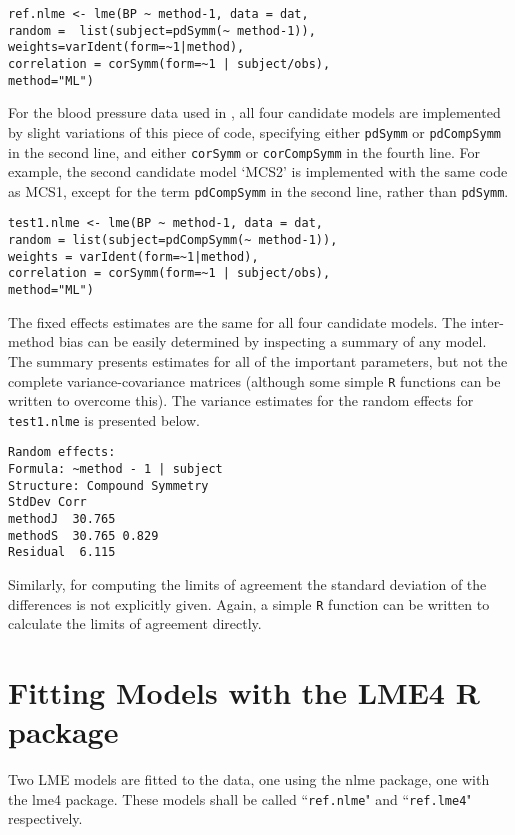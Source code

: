 \documentclass[12pt, a4paper]{report}
\theoremstyle{plain}
\theoremstyle{definition}
\theoremstyle{remark}
\begin{document}
\begin{framed}
\begin{verbatim}
ref.nlme <- lme(BP ~ method-1, data = dat,
random =  list(subject=pdSymm(~ method-1)),
weights=varIdent(form=~1|method),
correlation = corSymm(form=~1 | subject/obs), 
method="ML")
\end{verbatim}
\end{framed}

For the blood pressure data used in \citet{ARoy2009}, all four candidate models are implemented by slight variations of this piece of code, specifying either \texttt{pdSymm} or \texttt{pdCompSymm} in the second line, and either \texttt{corSymm} or \texttt{corCompSymm} in the fourth line.
For example, the second candidate model `MCS2' is implemented with the same code as MCS1, except for the term \texttt{pdCompSymm} in the second line, rather than \texttt{pdSymm}.

\begin{framed}
\begin{verbatim}
test1.nlme <- lme(BP ~ method-1, data = dat,
random = list(subject=pdCompSymm(~ method-1)),
weights = varIdent(form=~1|method),
correlation = corSymm(form=~1 | subject/obs), 
method="ML")
\end{verbatim}
\end{framed}

The fixed effects estimates are the same for all four candidate models. The inter-method bias can be easily determined by inspecting a summary of any model. The summary presents estimates for all of the important parameters, but not the complete variance-covariance matrices (although some simple \texttt{R} functions can be written to overcome this). The variance estimates for the random effects for \texttt{test1.nlme} is presented below.

\begin{framed}
\begin{verbatim}
Random effects:
Formula: ~method - 1 | subject
Structure: Compound Symmetry
StdDev Corr
methodJ  30.765
methodS  30.765 0.829
Residual  6.115
\end{verbatim}
\end{framed}

Similarly, for computing the limits of agreement the standard deviation of the differences is not explicitly given. Again, a simple \texttt{R} function can be written to calculate the limits of agreement directly.


\newpage


\section{Fitting Models with the LME4 R package}
Two LME models are fitted to the data, one using the nlme package, one with the lme4 package. These models shall be called ``\texttt{ref.nlme}" and ``\texttt{ref.lme4}" respectively.
\end{document}
